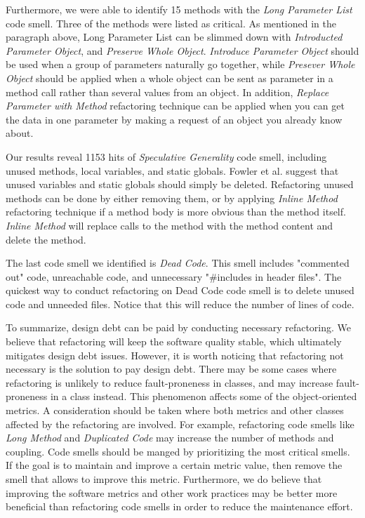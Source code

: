 Furthermore, we were able to identify 15 methods with the \textit{Long Parameter List} code smell. Three of the methods were listed as critical. As mentioned in the paragraph above, Long Parameter List can be slimmed down with \textit{Introducted Parameter Object}, and \textit{Preserve Whole Object}. \textit{Introduce Parameter Object} should be used when a group of parameters naturally go together, while \textit{Presever Whole Object} should be applied when a whole object can be sent as parameter in a method call rather than several values from an object. In addition, \textit{Replace Parameter with Method} refactoring technique can be applied when you can get the data in one parameter by making a request of an object you already know about\cite{fowler1999refactoring}.

Our results reveal 1153 hits of \textit{Speculative Generality} code smell, including unused methods, local variables, and static globals. Fowler et al.\cite{fowler1999refactoring} suggest that unused variables and static globals should simply be deleted. Refactoring unused methods can be done by either removing them, or by applying \textit{Inline Method} refactoring technique if a method body is more obvious than the method itself. \textit{Inline Method} will replace calls to the method with the method content and delete the method.

The last code smell we identified is \textit{Dead Code}. This smell includes "commented out" code, unreachable code, and unnecessary "\#includes in header files". The quickest way to conduct refactoring on Dead Code code smell is to delete unused code and unneeded files. Notice that this will reduce the number of lines of code.

To summarize, design debt can be paid by conducting necessary refactoring. We believe that refactoring will keep the software quality stable, which ultimately mitigates design debt issues. However, it is worth noticing that refactoring not necessary is the solution to pay design debt. There may be some cases where refactoring is unlikely to reduce fault-proneness in classes, and may increase fault-proneness in a class instead\cite{hall2014some}. This phenomenon affects some of the object-oriented metrics. A consideration should be taken where both metrics and other classes affected by the refactoring are involved. For example, refactoring code smells like \textit{Long Method} and \textit{Duplicated Code} may increase the number of methods and coupling. Code smells should be manged by prioritizing the most critical smells. If the goal is to maintain and improve a certain metric value, then remove the smell that allows to improve this metric. Furthermore, we do believe that improving the software metrics and other work practices may be better more beneficial than refactoring code smells in order to reduce the maintenance effort.




